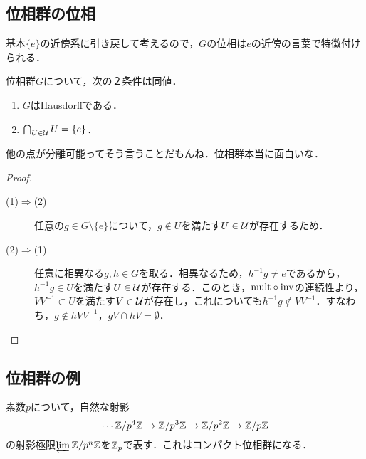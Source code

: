 \documentclass[uplatex,dvipdfmx]{jsreport}
\begin{document}
\subsection{位相群の位相}

\begin{tcolorbox}[colframe=ForestGreen, colback=ForestGreen!10!white,breakable,colbacktitle=ForestGreen!40!white,coltitle=black,fonttitle=\bfseries\sffamily,
title=]
    基本$\{e\}$の近傍系に引き戻して考えるので，$G$の位相は$e$の近傍の言葉で特徴付けられる．
\end{tcolorbox}

\begin{proposition}[ハウスドルフ位相群の特徴付け]
    位相群$G$について，次の２条件は同値．
    \begin{enumerate}
        \item $G$はHausdorffである．
        \item $\bigcap_{U\in\mathcal{U}}U=\{e\}$．
    \end{enumerate}
\end{proposition}
\begin{remarks}
    他の点が分離可能ってそう言うことだもんね．位相群本当に面白いな．
\end{remarks}
\begin{proof}\mbox{}
    \begin{description}
        \item[(1)$\Rightarrow$(2)] 任意の$g\in G\setminus\{e\}$について，$g\notin U$を満たす$U\in\mathcal{U}$が存在するため．
        \item[(2)$\Rightarrow$(1)] 任意に相異なる$g,h\in G$を取る．相異なるため，$h^{-1}g\ne e$であるから，$h^{-1}g\in U$を満たす$U\in\mathcal{U}$が存在する．このとき，$\mathrm{mult}\circ\mathrm{inv}$の連続性より，$VV^{-1}\subset U$を満たす$V\in\mathcal{U}$が存在し，これについても$h^{-1}g\notin VV^{-1}$．すなわち，$g\notin hVV^{-1}$，$gV\cap hV=\emptyset$．
    \end{description}
\end{proof}

\subsection{位相群の例}

\begin{example}
    素数$p$について，自然な射影
    \[\cdots\mathbb{Z}/p^4\mathbb{Z}\to\mathbb{Z}/p^3\mathbb{Z}\to\mathbb{Z}/p^2\mathbb{Z}\to\mathbb{Z}/p\mathbb{Z}\]
    の射影極限$\varprojlim\mathbb{Z}/p^n\mathbb{Z}$を$\mathbb{Z}_p$で表す．これはコンパクト位相群になる．
\end{example}
\end{document}
